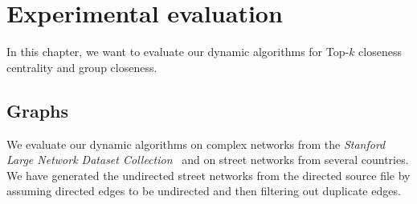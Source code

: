 \chapter{Experimental evaluation}
\label{ch:experiments}

In this chapter, we want to evaluate our dynamic algorithms for Top-$k$ closeness centrality and group closeness. 

\section{Graphs}
We evaluate our dynamic algorithms on complex networks from the \emph{Stanford Large Network Dataset Collection}~\cite{snapnets} and on street networks from several countries. We have generated the undirected street networks from the directed source file by assuming directed edges to be undirected and then filtering out duplicate edges.

